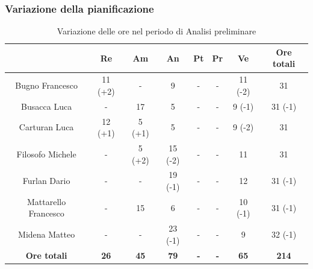 \subsubsection{Variazione della pianificazione} \label{subsubsection:variazione_pianificazione_analisi}
\begin{table}[H]
  \centering
  \renewcommand{\arraystretch}{1.8}
  \begin{tabular}{c|c|c|c|c|c|c|c}
    \rowcolor[HTML]{125E28}
    \multicolumn{1}{c}{\color[HTML]{FFFFFF}\textbf{Nominativo}}
                         & \multicolumn{1}{c}{\color[HTML]{FFFFFF}\textbf{ Re }}
                         & \multicolumn{1}{c}{\color[HTML]{FFFFFF}\textbf{ Am}}
                         & \multicolumn{1}{c}{\color[HTML]{FFFFFF}\textbf{ An }}
                         & \multicolumn{1}{c}{\color[HTML]{FFFFFF}\textbf{ Pt }}
                         & \multicolumn{1}{c}{\color[HTML]{FFFFFF}\textbf{ Pr }}
                         & \multicolumn{1}{c}{\color[HTML]{FFFFFF}\textbf{ Ve }}
                         & \multicolumn{1}{c}{\color[HTML]{FFFFFF}\textbf{ Ore totali }}                                                                                    \\
    \hline
    Bugno Francesco      & 11 (+2)                                                       & -           & 9           & -          & -          & 11 (-2)     & 31           \\
    Busacca Luca         & -                                                             & 17          & 5           & -          & -          & 9  (-1)     & 31 (-1)      \\
    Carturan Luca        & 12 (+1)                                                       & 5 (+1)      & 5           & -          & -          & 9  (-2)     & 31           \\
    Filosofo Michele     & -                                                             & 5 (+2)      & 15 (-2)     & -          & -          & 11          & 31           \\
    Furlan Dario         & -                                                             & -           & 19 (-1)     & -          & -          & 12          & 31 (-1)      \\
    Mattarello Francesco & -                                                             & 15          & 6           & -          & -          & 10 (-1)     & 31 (-1)      \\
    Midena Matteo        & -                                                             & -           & 23 (-1)     & -          & -          & 9           & 32 (-1)      \\
    \textbf{Ore totali}  & \textbf{26}                                                   & \textbf{45} & \textbf{79} & \textbf{-} & \textbf{-} & \textbf{65} & \textbf{214}
  \end{tabular}
  \caption{Variazione delle ore nel periodo di Analisi preliminare}
\end{table}

